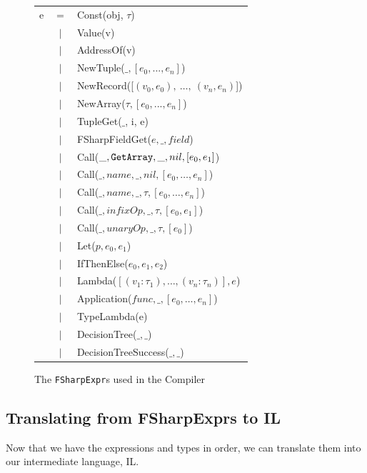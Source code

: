 \begin{figure}[H]
  \centering
  \begin{tabular}{@{}l c l}%
e & $=$ &   Const(obj, $\tau$) \\
 & $\vert$ &   Value(v) \\
 & $\vert$ &   AddressOf(v) \\
 & $\vert$ &   NewTuple($\_, [e_0,...,e_n]$) \\
 & $\vert$ &   NewRecord([$(v_0 , e_0),~\ldots,~(v_n , e_n)$]) \\
 & $\vert$ &   NewArray($\tau, [e_0,...,e_n]$) \\
 & $\vert$ &   TupleGet($\_$, i, e) \\
 & $\vert$ &   FSharpFieldGet($e, \_, field$) \\
 & $\vert$ &     Call($\_, \text{\ttfamily GetArray}, \_, nil, [e_0, e_1]$) \\
 & $\vert$ &     Call($\_, name, \_, nil, [e_0, \ldots, e_n]$) \\
 & $\vert$ &     Call($\_, name, \_, \tau, [e_0, \ldots, e_n]$) \\
 & $\vert$ &     Call($\_, infixOp, \_, \tau, [e_0, e_1]$) \\
 & $\vert$ &     Call($\_, unaryOp, \_, \tau, [e_0]$) \\
 & $\vert$ &   Let($p, e_0, e_1$) \\
 & $\vert$ &   IfThenElse($e_0, e_1, e_2$) \\
 & $\vert$ &   Lambda($[(v_1 : \tau_1), \ldots,(v_n : \tau_n)] , e$) \\
 & $\vert$ &   Application($func, \_, [e_0, \ldots, e_n]$) \\
 & $\vert$ &   TypeLambda(e) \\
 & $\vert$ &   DecisionTree($\_, \_$) \\
 & $\vert$ &   DecisionTreeSuccess($\_, \_$) \\
\end{tabular}
\caption{The \texttt{FSharpExpr}s used in the \fshark{}Compiler}
\label{fig:fsharpexprs1}
\end{figure}

\subsection{Translating from FSharpExprs to \fshark{}IL}
Now that we have the \fsharp{} expressions and types in order, we can translate
them into our \fshark{} intermediate language, \fshark{}IL.

